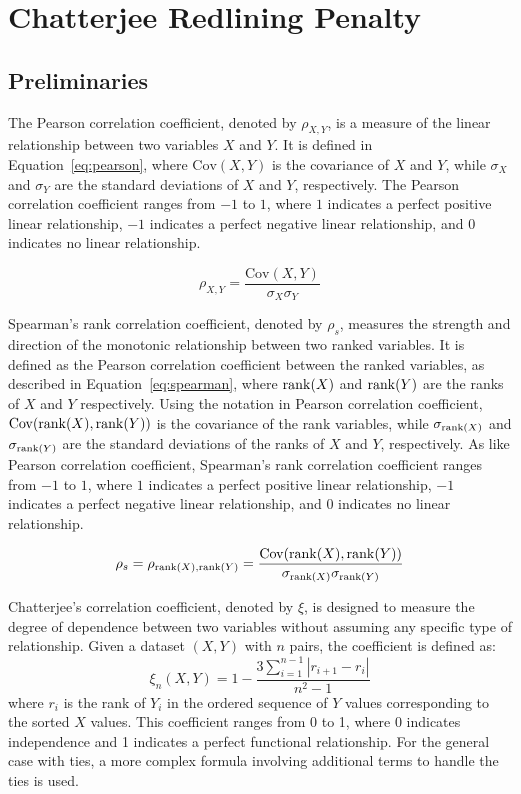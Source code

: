 \chapter{Chatterjee Redlining Penalty}

\section{Preliminaries}

The Pearson correlation coefficient, denoted by $\rho_{X,Y}$, is a measure of the linear relationship between two variables $X$ and $Y$. It is defined in Equation~\ref{eq:pearson}, where $\mathrm{Cov}(X, Y)$ is the covariance of $X$ and $Y$, while $\sigma_X$ and $\sigma_Y$ are the standard deviations of $X$ and $Y$, respectively. The Pearson correlation coefficient ranges from $-1$ to $1$, where $1$ indicates a perfect positive linear relationship, $-1$ indicates a perfect negative linear relationship, and $0$ indicates no linear relationship.

\begin{equation}\label{eq:pearson}
\rho_{X,Y} = \frac{\mathrm{Cov}(X, Y)}{\sigma_X \sigma_Y}
\end{equation}

Spearman's rank correlation coefficient, denoted by $\rho_s$, measures the strength and direction of the monotonic relationship between two ranked variables. It is defined as the Pearson correlation coefficient between the ranked variables, as described in Equation~\ref{eq:spearman}, where $\operatorname{rank}(X)$ and $\operatorname{rank}(Y)$ are the ranks of $X$ and $Y$ respectively. Using the notation in Pearson correlation coefficient, $\mathrm{Cov}(\operatorname{rank}(X), \operatorname{rank}(Y))$ is the covariance of the rank variables, while $\sigma_{\operatorname{rank}(X)}$ and $\sigma_{\operatorname{rank}(Y)}$ are the standard deviations of the ranks of $X$ and $Y$, respectively. As like Pearson correlation coefficient, Spearman's rank correlation coefficient ranges from $-1$ to $1$, where $1$ indicates a perfect positive linear relationship, $-1$ indicates a perfect negative linear relationship, and $0$ indicates no linear relationship.

\begin{equation}\label{eq:spearman}
\rho_s = \rho_{\operatorname{rank}(X),\operatorname{rank}(Y)} = \frac{\mathrm{Cov}(\operatorname{rank}(X), \operatorname{rank}(Y))}{\sigma_{\operatorname{rank}(X)} \sigma_{\operatorname{rank}(Y)}}
\end{equation}

Chatterjee's correlation coefficient, denoted by $\xi$, is designed to measure the degree of dependence between two variables without assuming any specific type of relationship. Given a dataset $(X, Y)$ with $n$ pairs, the coefficient is defined as:
\begin{equation}
\xi_n(X,Y) = 1 - \frac{3 \sum_{i=1}^{n-1} |r_{i+1} - r_i|}{n^2 - 1}
\end{equation}
where $r_i$ is the rank of $Y_i$ in the ordered sequence of $Y$ values corresponding to the sorted $X$ values. This coefficient ranges from 0 to 1, where 0 indicates independence and 1 indicates a perfect functional relationship. For the general case with ties, a more complex formula involving additional terms to handle the ties is used.

